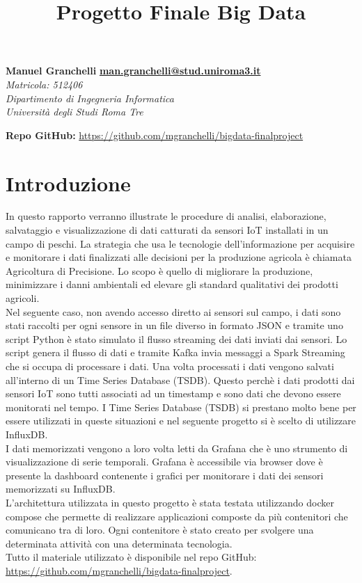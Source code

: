 \documentclass{article}
\title{\textbf{Progetto Finale Big Data}}
\date{}
\begin{document}
\maketitle

\begin{flushleft}
\textbf{Manuel Granchelli} 
\hfill {\href{mailto:man.granchelli@stud.uniroma3.it}{\textbf{man.granchelli@stud.uniroma3.it}}} \\
\textit{Matricola: 512406}\\
\textit{Dipartimento di Ingegneria Informatica}\\
\textit{Università degli Studi Roma Tre}\\
\par\bigskip
\textbf{Repo GitHub:} \href{https://github.com/mgranchelli/bigdata-finalproject}{https://github.com/mgranchelli/bigdata-finalproject}
\end{flushleft}

\section*{Introduzione}
In questo rapporto verranno illustrate le procedure di analisi, elaborazione, salvataggio e visualizzazione di dati catturati da sensori IoT installati in un campo di peschi. La strategia che usa le tecnologie dell'informazione per acquisire e monitorare i dati finalizzati alle decisioni per la produzione agricola è chiamata Agricoltura di Precisione. Lo scopo è quello di migliorare la produzione, minimizzare i danni ambientali ed elevare gli standard qualitativi dei prodotti agricoli.\\
Nel seguente caso, non avendo accesso diretto ai sensori sul campo, i dati sono stati raccolti per ogni sensore in un file diverso in formato JSON e tramite uno script Python è stato simulato il flusso streaming dei dati inviati dai sensori.
Lo script genera il flusso di dati e tramite Kafka invia messaggi a Spark Streaming che si occupa di processare i dati. Una volta processati i dati vengono salvati all'interno di un Time Series Database (TSDB). Questo perchè i dati prodotti dai sensori IoT sono tutti associati ad un timestamp e sono dati che devono essere monitorati nel tempo. I Time Series Database (TSDB) si prestano molto bene per essere utilizzati in queste situazioni e nel seguente progetto si è scelto di utilizzare InfluxDB. \\
I dati memorizzati vengono a loro volta letti da Grafana che è uno strumento di visualizzazione di serie temporali. Grafana è accessibile via browser dove è presente la dashboard contenente i grafici per monitorare i dati dei sensori memorizzati su InfluxDB. \\
L'architettura utilizzata in questo progetto è stata testata utilizzando docker compose che permette di realizzare applicazioni composte da più contenitori che comunicano tra di loro. Ogni contenitore è stato creato per svolgere una determinata attività con una determinata tecnologia. \\
Tutto il materiale utilizzato è disponibile nel repo GitHub:\\ \href{https://github.com/mgranchelli/bigdata-finalproject}{https://github.com/mgranchelli/bigdata-finalproject}.
\end{document}
